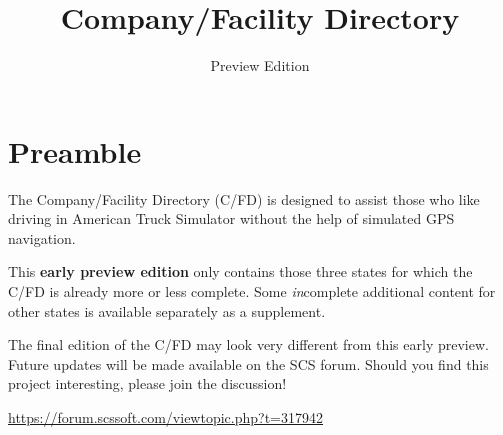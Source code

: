 
\subject{City location descriptions for ATS}
\title{Company\!/Facility Directory}
\subtitle{Preview Edition}


\usepackage{scrlayer-scrpage}  %



\maketitle

\section*{Preamble}

{
\justifying

The Company/Facility Directory (C/FD) is designed to assist those who like driving in American Truck Simulator without the help of simulated GPS navigation.

This \textbf{early preview edition} only contains those three states for which the C/FD is already more or less complete.
Some \emph{in}complete additional content for other states is available separately as a supplement.



The final edition of the C/FD may look very different from this early preview.
Future updates will be made available on the SCS forum.
Should you find this project interesting, please join the discussion!

\centering \vspace{1ex}
\url{https://forum.scssoft.com/viewtopic.php?t=317942} \par
}

